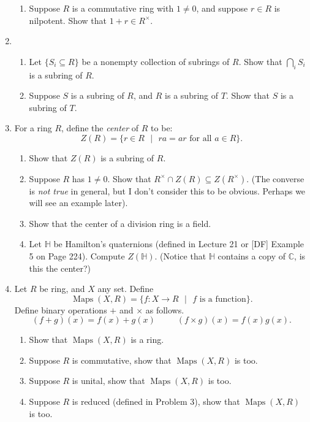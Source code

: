 \documentclass[11pt]{article}
\newcommand{\maps}{\operatorname{Maps}}
\newcommand{\bC}{\mathbb{C}}
\newcommand{\bH}{\mathbb{H}}
\begin{document}
\begin{enumerate}
{\begin{enumerate}
{    }
    \item{
    Suppose $R$ is a commutative ring with $1\not=0$, and suppose $r\in R$ is nilpotent.  Show that $1+r\in R^\times$.
    }
  \end{enumerate}
  }
  \item{
  \begin{enumerate}
    \item{
    Let $\{S_i\subseteq R\}$ be a nonempty collection of subrings of $R$.  Show that $\bigcap_i S_i$ is a subring of $R$.
    }
    \item{
    Suppose $S$ is a subring of $R$, and $R$ is a subring of $T$.  Show that $S$ is a subring of $T$.
    }
  \end{enumerate}
  }
  \item{
  For a ring $R$, define the \textit{center} of $R$ to be:
  \[Z(R) = \{r\in R\text{ }|\text{ }ra = ar\text{ for all }a\in R\}.\]
  \begin{enumerate}
    \item{
    Show that $Z(R)$ is a subring of $R$.
    }
    \item{
    Suppose $R$ has $1\not=0$.  Show that $R^\times\cap Z(R)\subseteq Z(R^\times)$.  (The converse is \textit{not true} in general, but I don't consider this to be obvious.  Perhaps we will see an example later).
    }
    \item{
    Show that the center of a division ring is a field.
    }
    \item{
    Let $\bH$ be Hamilton's quaternions (defined in Lecture 21 or [DF] Example 5 on Page 224).  Compute $Z(\bH)$.  (Notice that $\bH$ contains a copy of $\bC$, is this the center?)
    }
  \end{enumerate}
  }
  \item{
  Let $R$ be ring, and $X$ any set.  Define
  \[\maps(X,R) = \{f:X\to R\text{ }|\text{ }f\text{ is a function}\}.\]
  Define binary operations $+$ and $\times$ as follows.
  \[(f+g)(x) = f(x) + g(x)\hspace{30pt}(f\times g)(x) = f(x)g(x).\]
  \begin{enumerate}
    \item{
    Show that $\maps(X,R)$ is a ring.
    }
    \item{
    Suppose $R$ is commutative, show that $\maps(X,R)$ is too.
    }
    \item{
    Suppose $R$ is unital, show that $\maps(X,R)$ is too.
    }
    \item{
    Suppose $R$ is reduced (defined in Problem 3), show that $\maps(X,R)$ is too.
}
\end{enumerate}}
\end{enumerate}
\end{document}
